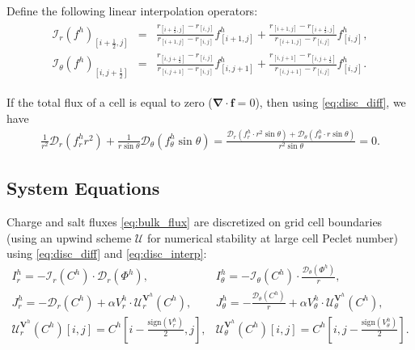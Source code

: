 \documentclass[10pt]{ijnam}
\newcommand{\sign}{\ensuremath{\mathrm{sign}}}
\newcommand{\pars}[1]{\left(#1\right)}
\newcommand{\half}{\frac{1}{2}}
\newcommand\bnabla{\boldsymbol{\nabla}}
\newcommand\bV{\boldsymbol{V}}
\newcommand\cI{\mathcal{I}}
\newcommand\cD{\mathcal{D}}
\begin{document}
Define the following linear interpolation operators:
\begin{eqnarray} \label{eq:disc_interp}
\begin{array}{rcl}
\cI_r(f^h)_{\left[i+\half,j\right]} &=& 
\frac{r_{\left[i+\half,j\right]} - r_{\left[i,j\right]}}
{r_{\left[i+1,j\right]} - r_{\left[i,j\right]}} 
f^h_{\left[i+1,j\right]} 
+ 
\frac{r_{\left[i+1,j\right]} - r_{\left[i+\half,j\right]}}
{r_{\left[i+1,j\right]} - r_{\left[i,j\right]}}
f^h_{\left[i,j\right]},
\\
\cI_\theta(f^h)_{\left[i,j+\half\right]} &=& 
\frac{r_{\left[i,j+\half\right]} - r_{\left[i,j\right]}}
{r_{\left[i,j+1\right]} - r_{\left[i,j\right]}}
  f^h_{\left[i,j+1\right]} + 
\frac{ r_{\left[i,j+1\right]} - r_{\left[i,j+\half\right]}}
{r_{\left[i,j+1\right]} - r_{\left[i,j\right]}}
  f^h_{\left[i,j\right]}.
\end{array}
\end{eqnarray}

If the total flux of a cell is equal to zero ($\bnabla \cdot \boldsymbol{f} = 0$), 
then using \eqref{eq:disc_diff}, we have
\begin{eqnarray}
\frac{1}{r^2} \cD_r\pars{f^h_r r^2} + 
\frac{1}{r \sin\theta} \cD_\theta\pars{f^h_\theta \sin\theta} =
\frac{\cD_r\pars{f^h_r \cdot r^2 \sin\theta} + 
\cD_\theta\pars{f^h_\theta \cdot r \sin\theta}}{r^2 \sin\theta} = 0. 
\end{eqnarray}

\subsection{System Equations} \label{sec:disc_equations}
Charge and salt fluxes \eqref{eq:bulk_flux} are discretized on grid cell boundaries 
(using an upwind scheme $\mathcal{U}$ for numerical stability at large cell Peclet number)  
using \eqref{eq:disc_diff} and \eqref{eq:disc_interp}:
\begin{eqnarray} \nonumber
I^h_r = -\cI_r(C^h) \cdot \cD_r(\varPhi^h), &
I^h_\theta = -\cI_\theta(C^h) \cdot \frac{\cD_\theta(\varPhi^h)}{r}, \\
J^h_r = -\cD_r(C^h) + \alpha V^h_r \cdot \mathcal{U}^{\bV^h}_r (C^h), &
J^h_\theta = -\frac{\cD_\theta(C^h)}{r} + \alpha V^h_\theta \cdot \mathcal{U}^{\bV^h}_\theta (C^h), 
\\ \nonumber
 \mathcal{U}^{\bV^h}_r(C^h)[i,j] = C^h\left[i-\frac{\sign(V^h_r)}{2}, j\right], &
 \mathcal{U}^{\bV^h}_\theta(C^h)[i,j] = C^h\left[i, j-\frac{\sign(V^h_\theta)}{2}\right]. 
\end{eqnarray}
\end{document}
